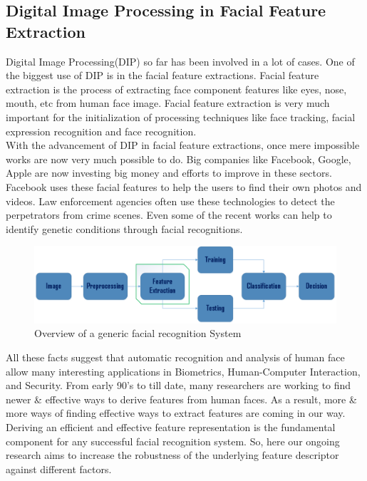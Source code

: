 \documentclass[12pt]{article}
\begin{document}
\subsection{Digital Image Processing in Facial Feature Extraction}
\noindent Digital Image Processing(DIP) so far has been involved in a lot of cases. One of the biggest use of DIP is in the facial feature extractions. Facial feature extraction is the process of extracting face component features like eyes, nose, mouth, etc from human face image. Facial feature extraction is very much important for the initialization of processing techniques like face tracking, facial expression recognition and face recognition\cite{facialExpressions1}. \\

With the advancement of DIP in facial feature extractions, once mere impossible works are now very much possible to do. Big companies like Facebook, Google, Apple are now investing big money and efforts to improve in these sectors. Facebook uses these facial features to help the users to find their own photos and videos. Law enforcement agencies often use these technologies to detect the perpetrators from crime scenes. Even some of the recent works can help to identify genetic conditions through facial recognitions\cite{FaceGene}.\\
\linebreak
\begin{figure}[h]
	\centering
	\includegraphics[width=\textwidth]{Pattern_Recognition_Framework.png}
	\caption{Overview of a generic facial recognition System}
	\label{fig:recog}
	
\end{figure} 

\noindent All these facts suggest that automatic recognition and analysis of human face allow many interesting applications in Biometrics, Human-Computer Interaction, and Security. From early 90's to till date, many researchers are working to find newer \& effective ways to derive features from human faces. As a result, more \& more ways of finding effective ways to extract features are coming in our way.\\
\linebreak
Deriving an efficient and effective feature representation is the fundamental component for any successful facial recognition system.
So, here our ongoing research aims to increase the robustness of the underlying feature descriptor against different factors.\\
\end{document}
